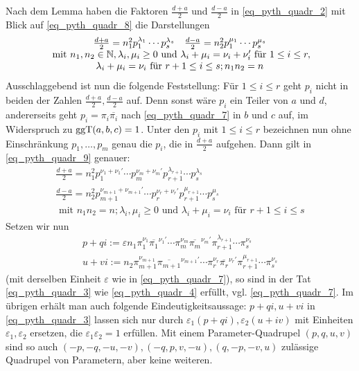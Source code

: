 	Nach dem Lemma haben die Faktoren $\frac{d+a}{2}$ und $\frac{d-a}{2}$ in \eqref{eq_pyth_quadr_2} mit Blick auf \eqref{eq_pyth_quadr_8} die Darstellungen
	\begin{equation}
		\begin{array}{c}
			\frac{d+a}{2} = n_1^2 p_1^{\lambda_1} \cdots p_s^{\lambda_s} \quad \frac{d-a}{2} = n_2^2 p_1^{\mu_1} \cdots p_s^{\mu_s} \\
			\text{ mit } n_1,n_2 \in \mathbb{N}, \lambda_i,\mu_i \geq 0 \text{ und } \lambda_i + \mu_i = \nu_i + \nu_i' \text{ für } 1 \leq i \leq r, \label{eq_pyth_quadr_9} \\
			\lambda_i + \mu_i = \nu_i \text{ für } r+1 \leq i \leq s; n_1 n_2 = n
		\end{array}
	\end{equation}
	Ausschlaggebend ist nun die folgende Feststellung: Für $1 \leq i \leq r$ geht $p_i$ nicht in beiden der Zahlen $\frac{d+a}{2}, \frac{d-a}{2}$ auf. Denn sonst wäre $p_i$ ein Teiler von $a$ und $d$, andererseits geht $p_i = \pi_i \overline{\pi_i}$ nach \eqref{eq_pyth_quadr_7} in $b$ und $c$ auf, im Widerspruch zu $\operatorname{ggT}(a,b,c)=1$. Unter den $p_i$ mit $1 \leq i \leq r$ bezeichnen nun ohne Einschränkung $p_1, \dots, p_m$ genau die $p_i$, die in $\frac{d+a}{2}$ aufgehen. Dann gilt in \eqref{eq_pyth_quadr_9} genauer:
	\begin{equation}
		\begin{array}{c}
			\frac{d+a}{2} = n_1^2 p_1^{\nu_1 + \nu_1'} \cdots p_m^{\nu_m + \nu_m'} p_{r+1}^{\lambda_{r+1}} \cdots p_s^{\lambda_s} \\
			\frac{d-a}{2} = n_2^2 p_{m+1}^{\nu_{m+1} + \nu_{m+1}'} \cdots p_r^{\nu_r + \nu_r'} p_{r+1}^{\mu_{r+1}} \cdots p_s^{\mu_s} \label{eq_pyth_quadr_10} \\
			\text{ mit } n_1 n_2 = n; \lambda_i, \mu_i \geq 0 \text{ und } \lambda_i + \mu_i = \nu_i \text{ für } r+1 \leq i \leq s
		\end{array}
	\end{equation}
	Setzen wir nun
	\begin{equation}
		\begin{array}{c}
			p+qi := \varepsilon n_1 \pi_1^{\nu_1} \overline{\pi_1}^{\nu_1'} \cdots \pi_m^{\nu_m} \overline{\pi_m}^{\nu_m'} \pi_{r+1}^{\lambda_{r+1}} \cdots \pi_s^{\nu_s} \\
			u+vi := n_2 \pi_{m+1}^{\nu_{m+1}} \overline{\pi_{m+1}}^{\nu_{m+1}'} \cdots \pi_r^{\nu_r} \overline{\pi_r}^{\nu_r'} \pi_{r+1}^{\mu_{r+1}} \cdots \pi_s^{\nu_s}
		\end{array}		
	\end{equation}
	(mit derselben Einheit $\varepsilon$ wie in \eqref{eq_pyth_quadr_7}), so sind in der Tat \eqref{eq_pyth_quadr_3} wie \eqref{eq_pyth_quadr_4} erfüllt, vgl. \eqref{eq_pyth_quadr_7}. Im übrigen erhält man auch folgende Eindeutigkeitsaussage:
	$p+qi, u+vi$ in \eqref{eq_pyth_quadr_3} lassen sich nur durch $\varepsilon_1(p+qi), \varepsilon_2(u+iv)$ mit Einheiten $\varepsilon_1, \varepsilon_2$ ersetzen, die $\varepsilon_1 \varepsilon_2 = 1$ erfüllen. Mit einem Parameter-Quadrupel $(p,q,u,v)$ sind so auch $(-p,-q,-u,-v), (-q,p,v,-u), (q,-p,-v,u)$ zulässige Quadrupel von Parametern, aber keine weiteren.
	
